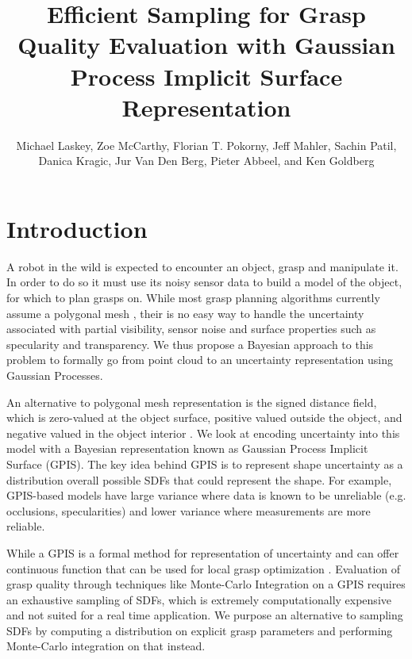\documentclass[letterpaper, 10 pt, conference]{ieeeconf}  %
\title{\LARGE \bf
Efficient Sampling for Grasp Quality Evaluation with Gaussian Process Implicit Surface Representation }
\author{Michael Laskey, Zoe McCarthy, Florian T. Pokorny, Jeff Mahler, Sachin Patil,\\ Danica Kragic, Jur Van Den Berg, Pieter Abbeel, and Ken Goldberg}%
\begin{document}
\maketitle
\thispagestyle{empty}
\pagestyle{empty}





\section{Introduction}

\vspace{10pt}

A robot in the wild is expected to encounter an object, grasp and manipulate it. In order to do so it must use its noisy sensor data to build a model of the object, for which to plan grasps on. While most grasp planning algorithms currently assume a polygonal mesh \cite{grasp_it}, their is no easy way to handle the uncertainty associated with partial visibility, sensor noise and surface properties such as specularity and transparency. We thus propose a Bayesian approach to this problem to formally go from point cloud to an uncertainty representation using Gaussian Processes. 

An alternative to polygonal mesh representation is the signed distance field, which is zero-valued at the object surface, positive valued outside the object, and negative valued in the object interior \cite{newcombe2011kinectfusion}. We look at encoding uncertainty into this model with a Bayesian representation known as Gaussian Process Implicit Surface (GPIS). The key idea behind GPIS is to represent shape uncertainty as a distribution overall possible SDFs that could represent the shape. For example, GPIS-based models have large variance where data is known to be unreliable (e.g. occlusions, specularities) and lower variance where measurements are more reliable. 
 
 While a GPIS is a formal method for representation of uncertainty and can offer continuous function that can be used for local grasp optimization \cite{jeff_paper}. Evaluation of grasp quality through techniques like Monte-Carlo Integration on a GPIS requires an exhaustive sampling of SDFs, which is extremely computationally expensive and not suited for a real time application. We purpose an alternative to sampling SDFs by computing a distribution on explicit grasp parameters and performing Monte-Carlo integration on that instead.  
\end{document}
